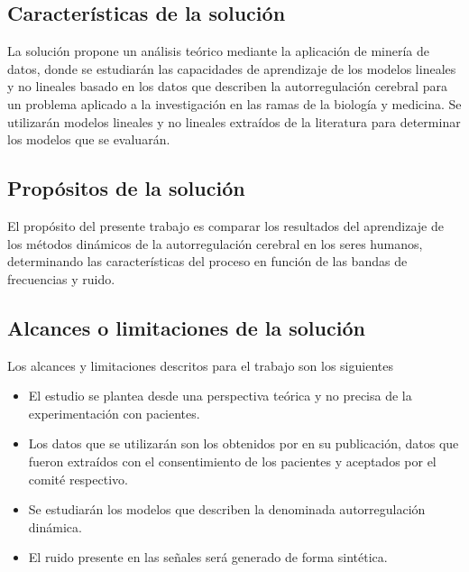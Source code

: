 \begin{comment}
La solución a este problema de minimización para obtener el vector de peso $\vec{w}$ se encuentra mediante el procedimiento estándar para un problema con restricciones de desigualdad en la aplicación de las condiciones de Kuhn-Tuker al problema dual. La principal ventaja del uso del parámetro $v$ es poder controlar el error y el número de \sv\, con un solo parámetro normalizado.

Para resolver el problema de la regresión no lineal basta con cambiar el producto interno entre dos variables independientes $\vec{x_i}\cdot\vec{x_j}$ por una función Kernel $K(\Phi(\vec{x_i})\cdot\Phi(\vec{x_j}))$. Algunas funciones Kernel que se puede utilizar puede ser la función de base radial gaussiano ($RBF$)
\end{comment}

\subsection{Características de la solución}
La solución propone un análisis teórico mediante la aplicación de minería de datos, donde se estudiarán las capacidades de aprendizaje de los modelos lineales y no lineales basado en los datos que describen la autorregulación cerebral para un problema aplicado a la investigación en las ramas de la biología y medicina. Se utilizarán modelos lineales y no lineales extraídos de la literatura para determinar los modelos que se evaluarán.

\subsection{Propósitos de la solución}
El propósito del presente trabajo es comparar los resultados del aprendizaje de los métodos dinámicos de la autorregulación cerebral en los seres humanos, determinando las características del proceso en función de las bandas de frecuencias y ruido.

\subsection{Alcances o limitaciones de la solución}
Los alcances y limitaciones descritos para el trabajo son los siguientes
\begin{itemize}
	\item El estudio se plantea desde una perspectiva teórica y no precisa de la experimentación con pacientes.

    \item Los datos que se utilizarán son los obtenidos por \cite{Mahony2000} en su publicación, datos que fueron extraídos con el consentimiento de los pacientes y aceptados por el comité respectivo.

	\item Se estudiarán los modelos que describen la denominada autorregulación dinámica.

	\item El ruido presente en las señales será generado de forma sintética.
\end{itemize}

